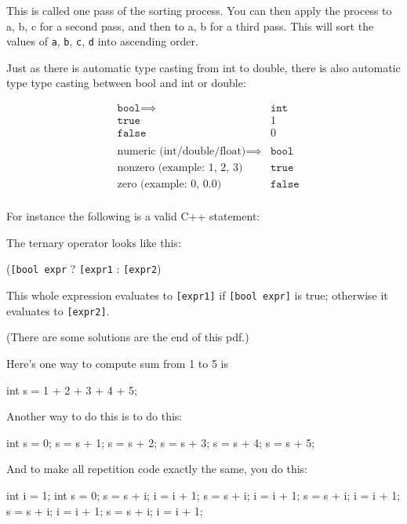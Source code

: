 This is called one pass of the sorting process. You can then apply the
process to a, b, c for a second pass, and then to a, b for a third pass.
This will sort the values of \texttt{a}, \texttt{b}, \texttt{c}, \texttt{d} into
ascending order.

Just as there is automatic type casting from int to double, there is
also automatic type type casting between bool and int or double:

\begin{align*}
&\texttt{bool} \implies &\texttt{int}\\
&\texttt{true} &1\\
&\texttt{false} &0\\\\
&\text{numeric (int/double/float)} \implies &\texttt{bool}\\
&\text{nonzero (example: 1, 2, 3)} &\texttt{true}\\
&\text{zero (example: 0, 0.0)} &\texttt{false}\\
\end{align*}

For instance the following is a valid C++ statement:

The ternary operator looks like this:
\begin{center}
(\texttt{[bool expr} ? \texttt{[expr1} : \texttt{[expr2})
\end{center}
This whole expression evaluates to \texttt{[expr1]} if \texttt{[bool
expr]} is true; otherwise it evaluates to \texttt{[expr2]}.

\newpage{}

(There are some solutions are the end of this pdf.)

Here's one way to compute sum from 1 to 5 is
\begin{console}
int s = 1 + 2 + 3 + 4 + 5; 
\end{console}

Another way to do this is to do this:
\begin{console}
int s = 0;
s = s + 1;
s = s + 2;
s = s + 3;
s = s + 4;
s = s + 5; 
\end{console}

And to make all repetition code exactly the same, you do this:
\begin{console}
int i = 1;
int s = 0;
s = s + i;
i = i + 1;
s = s + i;
i = i + 1;
s = s + i;
i = i + 1;
s = s + i;
i = i + 1;
s = s + i;
i = i + 1; 
\end{console}

